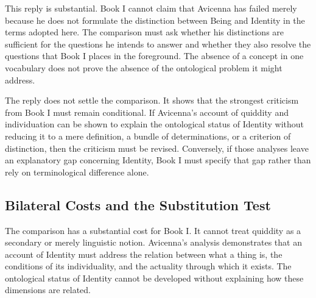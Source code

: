 \label{para:VS.B01.P01.C08.S13.SS16.P005}

This reply
is substantial.
Book I
cannot claim
that Avicenna
has failed
merely because
he does
not formulate
the distinction
between Being
and Identity
in the
terms adopted
here. The
comparison must
ask whether
his distinctions
are sufficient
for the
questions he
intends to
answer and
whether they
also resolve
the questions
that Book I
places in
the foreground.
The absence
of a
concept in
one vocabulary
does not
prove the
absence of
the ontological
problem it
might address.

\label{para:VS.B01.P01.C08.S13.SS16.P006}

The reply
does not
settle the
comparison. It
shows that
the strongest
criticism from
Book I
must remain
conditional. If
Avicenna's account
of quiddity
and individuation
can be
shown to
explain the
ontological status
of Identity
without reducing
it to
a mere
definition,
a bundle
of determinations,
or a
criterion of
distinction, then
the criticism
must be
revised. Conversely,
if those
analyses leave
an explanatory
gap concerning
Identity, Book I
must specify
that gap
rather than
rely on
terminological
difference alone.



\subsection{Bilateral Costs and the Substitution Test}
\label{subsec:ch08-avicenna-bilateral-costs}

\label{para:VS.B01.P01.C08.S13.SS17.P001}

The comparison
has a
substantial cost
for Book I.
It cannot
treat quiddity
as a
secondary or
merely linguistic
notion. Avicenna's
analysis demonstrates
that an
account of
Identity must
address the
relation between
what a
thing is,
the conditions
of its
individuality, and
the actuality
through which
it exists. The
ontological status
of Identity
cannot be
developed without
explaining how
these dimensions
are related.

\label{para:VS.B01.P01.C08.S13.SS17.P002}

